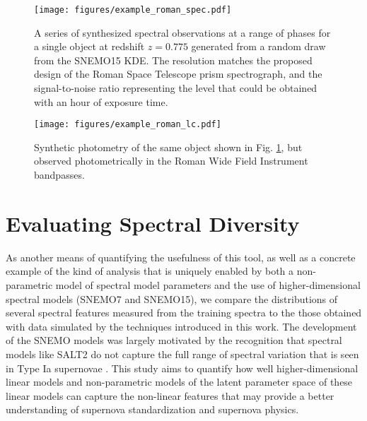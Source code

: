 \begin{figure}
    \centering
    \texttt{[image: figures/example\_roman\_spec.pdf]}
    \caption{A series of synthesized spectral observations at a range of phases for a single object at redshift $z=0.775$ generated from a random draw from the SNEMO15 KDE. The resolution matches the proposed design of the Roman Space Telescope prism spectrograph, and the signal-to-noise ratio representing the level that could be obtained with an hour of exposure time.}
    \label{fig:example_prism_spec}
\end{figure}

\begin{figure}
    \centering
    \texttt{[image: figures/example\_roman\_lc.pdf]}
    \caption{Synthetic photometry of the same object shown in Fig. \ref{fig:example_prism_spec}, but observed photometrically in the Roman Wide Field Instrument bandpasses.}
    \label{fig:example_roman_lc}
\end{figure}

\section{Evaluating Spectral Diversity}
\label{sec:spec_diversity}
As another means of quantifying the usefulness of this tool, as well as a concrete example of the kind of analysis that is uniquely enabled by both a non-parametric model of spectral model parameters and the use of higher-dimensional spectral models (SNEMO7 and SNEMO15), we compare the distributions of several spectral features measured from the training spectra to the those obtained with data simulated by the techniques introduced in this work. The development of the SNEMO models was largely motivated by the recognition that spectral models like SALT2 do not capture the full range of spectral variation that is seen in Type Ia supernovae \citep{Saunders2018}. This study aims to quantify how well higher-dimensional linear models and non-parametric models of the latent parameter space of these linear models can capture the non-linear features that may provide a better understanding of supernova standardization and supernova physics.

